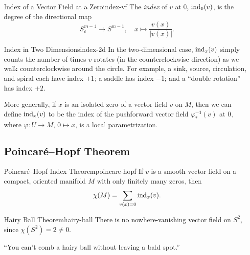 \begin{definition}{Index of a Vector Field at a Zero}{index-vf}
    The \emph{index} of $v$ at $0$, $\operatorname{ind}_0(v)$, is the degree of the directional map
    \[
        S_\varepsilon^{m-1} \to S^{m-1}, \quad x \mapsto \frac{v(x)}{|v(x)|}.
    \]
\end{definition}

\begin{example}{Index in Two Dimensions}{index-2d}
    In the two-dimensional case, $\operatorname{ind}_x(v)$ simply counts the number of times $v$ rotates (in the counterclockwise direction) as we walk counterclockwise around the circle. For example, a sink, source, circulation, and spiral each have index $+1$; a saddle has index $-1$; and a ``double rotation'' has index $+2$.
\end{example}

More generally, if $x$ is an isolated zero of a vector field $v$ on $M$, then we can define $\operatorname{ind}_x(v)$ to be the index of the pushforward vector field $\varphi_*^{-1}(v)$ at $0$, where $\varphi \colon U \to M$, $0 \mapsto x$, is a local parametrization.

\subsection{Poincar\'e--Hopf Theorem}

\begin{theorem}{Poincar\'e--Hopf Index Theorem}{poincare-hopf}
    If $v$ is a smooth vector field on a compact, oriented manifold $M$ with only finitely many zeros, then
    \[
        \chi(M) = \sum_{v(x) = 0} \operatorname{ind}_x(v).
    \]
\end{theorem}

\begin{corollary}{Hairy Ball Theorem}{hairy-ball}
    There is no nowhere-vanishing vector field on $S^2$, since $\chi(S^2) = 2 \neq 0$.

    ``You can't comb a hairy ball without leaving a bald spot.''
\end{corollary}

